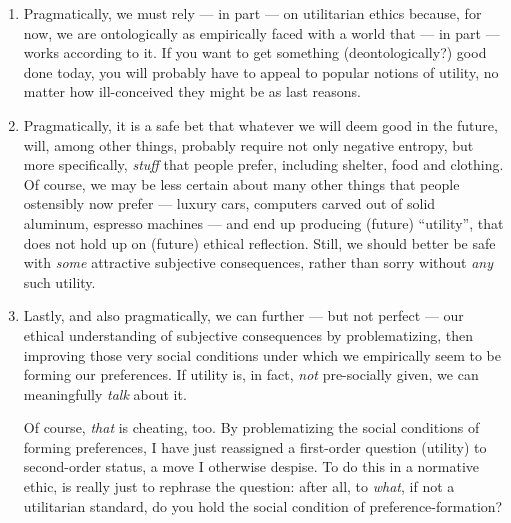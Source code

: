 \begin{enumerate}
	\item
	Pragmatically, we must rely --- in part --- on utilitarian ethics because, for now, we are ontologically as empirically faced with a world that --- in part --- works according to it.
	If you want to get something (deontologically?) good done today, you will probably have to appeal to popular notions of utility, no matter how ill-conceived they might be as last reasons.

	\item
	Pragmatically, it is a safe bet that whatever we will deem good in the future, will, among other things, probably require not only negative entropy, but more specifically, \emph{stuff} that people prefer, including shelter, food and clothing.
	Of course, we may be less certain about many other things that people ostensibly now prefer --- luxury cars, computers carved out of solid aluminum, espresso machines --- and end up producing (future) ``utility'', that does not hold up on (future) ethical reflection.
	Still, we should better be safe with \emph{some} attractive subjective consequences, rather than sorry without \emph{any} such utility.

	\item
	Lastly, and also pragmatically, we can further --- but not perfect --- our ethical understanding of subjective consequences by problematizing, then improving those very social conditions under which we empirically seem to be forming our preferences.
	If utility is, in fact, \emph{not} pre-socially given, we can meaningfully \emph{talk} about it.

	Of course, \emph{that} is cheating, too.
	By problematizing the social conditions of forming preferences, I have just reassigned a first-order question (utility) to second-order status, a move I otherwise despise.
	To do this in a normative ethic, is really just to rephrase the question:
	after all, to \emph{what}, if not a utilitarian standard, do you hold the social condition of preference-formation?


\end{enumerate}
